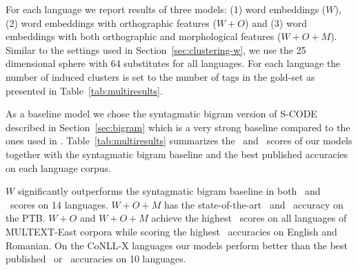 
For each language we report results of three models: (1) word
embeddings ($W$), (2) word embeddings with orthographic features
($W+O$) and (3) word embeddings with both orthographic and
morphological features ($W+O+M$).  Similar to the settings used in
Section~\ref{sec:clustering-w}, we use the 25 dimensional sphere with 64
substitutes for all languages.  For each language the number of
induced clusters is set to the number of tags in the gold-set as
presented in Table~\ref{tab:multiresults}.

As a baseline model we chose the syntagmatic bigram version of S-CODE
described in Section~\ref{sec:bigram} which is a very strong baseline
compared to the ones used in
\cite{christodoulopoulos-goldwater-steedman:2011:EMNLP}.
Table~\ref{tab:multiresults} summarizes the \mto\ and \vm\ scores of
our models together with the syntagmatic bigram baseline and the best
published accuracies on each language corpus.

$W$ significantly outperforms the syntagmatic bigram baseline in both
\mto\ and \vm\ scores on 14 languages.  $W+O+M$ has the
state-of-the-art \mto\ and \vm\ accuracy on the PTB.  $W+O$ and
$W+O+M$ achieve the highest \mto\ scores on all languages of
MULTEXT-East corpora while scoring the highest \vm\ accuracies on
English and Romanian.  On the CoNLL-X languages our models perform
better than the best published \mto\ or \vm\ accuracies on 10
languages.

